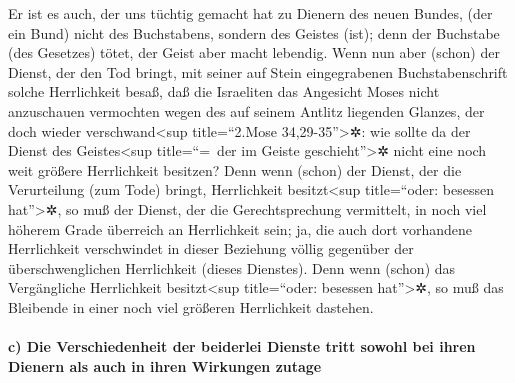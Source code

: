  Er ist es auch, der uns tüchtig gemacht hat zu Dienern
des neuen Bundes, (der ein Bund) nicht des Buchstabens, sondern des
Geistes (ist); denn der Buchstabe (des Gesetzes) tötet, der Geist aber
macht lebendig.  Wenn nun aber (schon) der Dienst, der den
Tod bringt, mit seiner auf Stein eingegrabenen Buchstabenschrift solche
Herrlichkeit besaß, daß die Israeliten das Angesicht Moses nicht
anzuschauen vermochten wegen des auf seinem Antlitz liegenden Glanzes,
der doch wieder verschwand\textless sup title=``2.Mose
34,29-35''\textgreater✲:  wie sollte da der Dienst des
Geistes\textless sup title=``=~der im Geiste geschieht''\textgreater✲
nicht eine noch weit größere Herrlichkeit besitzen?  Denn
wenn (schon) der Dienst, der die Verurteilung (zum Tode) bringt,
Herrlichkeit besitzt\textless sup title=``oder: besessen
hat''\textgreater✲, so muß der Dienst, der die Gerechtsprechung
vermittelt, in noch viel höherem Grade überreich an Herrlichkeit sein;
 ja, die auch dort vorhandene Herrlichkeit verschwindet
in dieser Beziehung völlig gegenüber der überschwenglichen Herrlichkeit
(dieses Dienstes).  Denn wenn (schon) das Vergängliche
Herrlichkeit besitzt\textless sup title=``oder: besessen
hat''\textgreater✲, so muß das Bleibende in einer noch viel größeren
Herrlichkeit dastehen.

\hypertarget{c-die-verschiedenheit-der-beiderlei-dienste-tritt-sowohl-bei-ihren-dienern-als-auch-in-ihren-wirkungen-zutage}{%
\paragraph{c) Die Verschiedenheit der beiderlei Dienste tritt sowohl bei
ihren Dienern als auch in ihren Wirkungen
zutage}\label{c-die-verschiedenheit-der-beiderlei-dienste-tritt-sowohl-bei-ihren-dienern-als-auch-in-ihren-wirkungen-zutage}}

